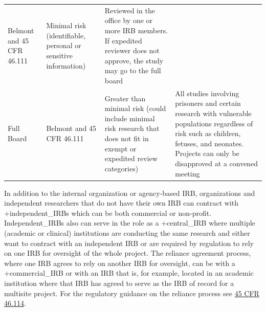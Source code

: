 \documentclass[
]{book}
\begin{document}
\begin{longtable}[]{@{}llll@{}}
\begin{minipage}[t]{0.21\columnwidth}
Belmont and 45
CFR 46.111\strut
\end{minipage} & \begin{minipage}[t]{0.22\columnwidth}\raggedright
Minimal risk
(identifiable,
personal or
sensitive
information)\strut
\end{minipage} & \begin{minipage}[t]{0.28\columnwidth}\raggedright
Reviewed in the
office by one or
more IRB members. If
expedited reviewer
does not approve,
the study may go to
the full board\strut
\end{minipage}\tabularnewline
\begin{minipage}[t]{0.16\columnwidth}\raggedright
Full Board\strut
\end{minipage} & \begin{minipage}[t]{0.21\columnwidth}\raggedright
Belmont and 45
CFR 46.111\strut
\end{minipage} & \begin{minipage}[t]{0.22\columnwidth}\raggedright
Greater than
minimal risk
(could include
minimal risk
research that
does not fit in
exempt or
expedited
review
categories)\strut
\end{minipage} & \begin{minipage}[t]{0.28\columnwidth}\raggedright
All studies
involving prisoners
and certain research
with vulnerable
populations
regardless of risk
such as children,
fetuses, and
neonates. Projects
can only be
disapproved at a
convened meeting\strut
\end{minipage}\tabularnewline
\bottomrule
\end{longtable}

In addition to the internal organization or agency-based IRB, organizations and independent researchers that do not have their own IRB can contract with +independent\_IRBs\textbar{} which can be both commercial or non-profit. Independent\_IRBs also can serve in the role as a +central\_IRB\textbar{} where multiple (academic or clinical) institutions are conducting the same research and either want to contract with an independent IRB or are required by regulation to rely on one IRB for oversight of the whole project. The reliance agreement process, where one IRB agrees to rely on another IRB for oversight, can be with a +commercial\_IRB\textbar{} or with an IRB that is, for example, located in an academic institution where that IRB has agreed to serve as the IRB of record for a multisite project. For the regulatory guidance on the reliance process see \href{https://www.law.cornell.edu/cfr/text/45/46.114}{45 CFR 46.114}.
\end{document}
